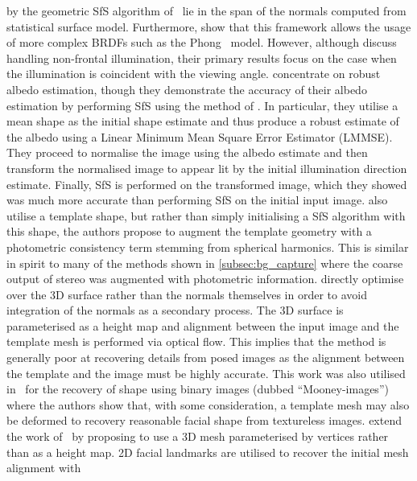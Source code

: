 by the geometric SfS algorithm of~\cite{worthington1999new,Smith:2007eb} lie
in the span of the normals computed from statistical surface model. Furthermore,
\citet{smith2010estimating} show that this framework allows the usage of
more complex BRDFs such as the Phong~\cite{tuong1973illumination} model.
However, although \citet{smith2010estimating} discuss handling non-frontal
illumination, their primary results focus on the case when the illumination
is coincident with the viewing angle.
\citet{biswas2009robust} concentrate on robust albedo estimation, though they
demonstrate the accuracy of their albedo estimation by performing SfS using the
method of \citet{ping1994shape}. In particular, they utilise a mean shape as the
initial shape estimate and thus produce a robust estimate of the albedo using a
Linear Minimum Mean Square Error Estimator (LMMSE). They proceed to normalise
the image using the albedo estimate and then transform the normalised image to
appear lit by the initial illumination direction estimate. Finally, SfS is
performed on the transformed image, which they showed was much more accurate
than performing SfS on the initial input image.
\citet{kemelmacher2011facereconstruction} also utilise a template shape, but
rather than simply initialising a SfS algorithm with this shape, the authors
propose to augment the template geometry with a photometric consistency term
stemming from spherical harmonics. This is similar in spirit to many of the
methods shown in \cref{subsec:bg_capture} where the coarse output of stereo was
augmented with photometric information.
\citet{kemelmacher2011facereconstruction} directly optimise over the 3D
surface rather than the normals themselves in order to avoid integration of the
normals as a secondary process. The 3D surface
is parameterised as a height map and alignment between the input
image and the template mesh is performed via optical flow. This implies that the
method is generally poor at recovering details from posed images as the
alignment between the template and the image must be highly accurate. This work
was also utilised in~\cite{kemelmacher2008mooney} for the recovery of shape
using binary images (dubbed ``Mooney-images'') where the authors show that, with
some consideration, a template mesh may also be deformed to recovery reasonable
facial shape from textureless images.
\citet{roth2015unconstrained} extend the work of~\cite{kemelmacher2011facereconstruction}
by proposing to use a 3D mesh parameterised by vertices rather than as a height
map. 2D facial landmarks are utilised to recover the initial mesh alignment with
